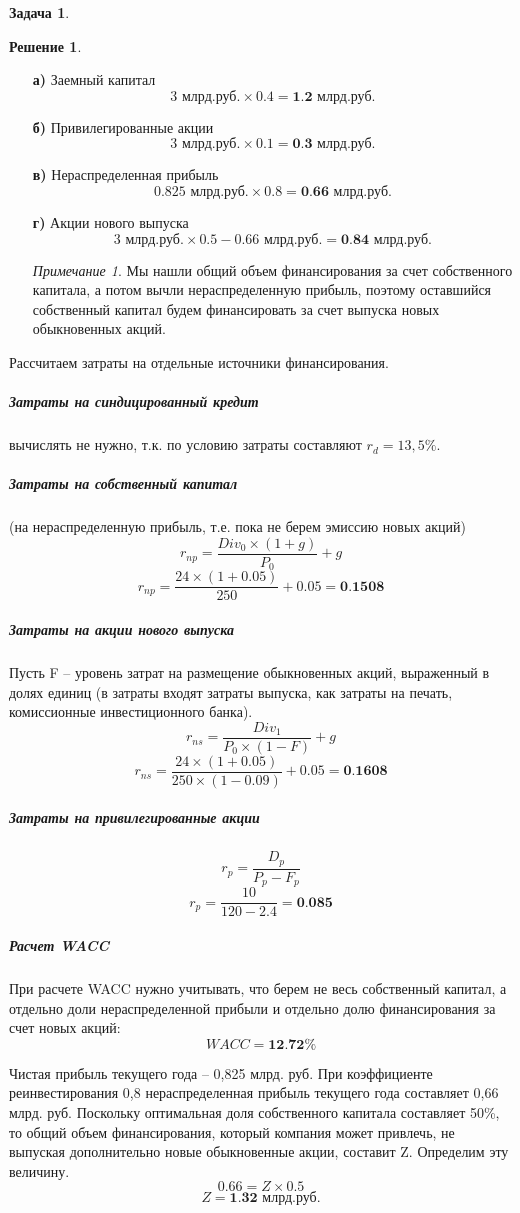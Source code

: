 \documentclass[a4paper, 14pt]{article}
\theoremstyle{plain} %
\theoremstyle{definition} %
\newtheorem*{solution}{Решение}
\newtheorem{problem}{Задача}[subsection]
\theoremstyle{remark} %
\newtheorem{nota}{Примечание}
\begin{document}
\begin{problem}
\begin{solution}
		\begin{itemize}
			\item[\textbf{а)}] Заемный капитал
			\[\text{3 млрд.руб.} \times 0.4 = \textbf{1.2 млрд.руб.}\]
			\item[\textbf{б)}] Привилегированные акции
			\[\text{3 млрд.руб.} \times 0.1 = \textbf{0.3 млрд.руб.}\]
			\item[\textbf{в)}] Нераспределенная прибыль
			\[\text{0.825 млрд.руб.} \times 0.8 = \textbf{0.66 млрд.руб.}\]
			\item[\textbf{г)}] Акции нового выпуска
			\[\text{3 млрд.руб.} \times 0.5 - \text{0.66 млрд.руб.}  = \textbf{0.84 млрд.руб.}\]
			\begin{nota}
				Мы нашли общий объем финансирования за счет собственного капитала, а потом вычли нераспределенную прибыль, поэтому оставшийся собственный капитал будем финансировать за счет выпуска новых обыкновенных акций.
			\end{nota}
		\end{itemize}

		Рассчитаем затраты на отдельные источники финансирования.
		\subparagraph{Затраты на синдицированный кредит} вычислять не нужно, т.к. по условию затраты составляют $r_{d} = 13,5\%$.
		\subparagraph{Затраты на собственный капитал} (на нераспределенную прибыль, т.е. пока не берем эмиссию новых акций)
		\[r_{np} = \frac{Div_{0}\times(1+g)}{P_{0}}+g\]
		\[r_{np} = \frac{24\times(1+0.05)}{250}+0.05 = \textbf{0.1508}\]
		\subparagraph{Затраты на акции нового выпуска} Пусть F  – уровень затрат на размещение обыкновенных акций, выраженный в долях единиц  (в затраты входят затраты выпуска, как затраты на печать, комиссионные инвестиционного банка).
		\[r_{ns} = \frac{Div_{1}}{P_{0}\times(1-F)}+g\]
		\[r_{ns} = \frac{24\times(1+0.05)}{250\times(1-0.09)}+0.05 = \textbf{0.1608}\]
		\subparagraph{Затраты на привилегированные акции}
		\[r_{p} = \frac{D_{p}}{P_{p} - F_{p}}\]
		\[r_{p} = \frac{10}{120 - 2.4} = \textbf{0.085}\]

		\subparagraph{Расчет WACC} При расчете  WACC нужно учитывать, что берем не весь собственный капитал, а отдельно доли нераспределенной прибыли и отдельно долю финансирования за счет новых акций:
		\[WACC = \textbf{12.72\%}\]

		Чистая прибыль текущего года    –    0,825 млрд. руб. При коэффициенте реинвестирования  0,8 нераспределенная прибыль текущего года составляет  0,66 млрд. руб. Поскольку оптимальная доля собственного капитала составляет  50\%, то общий объем финансирования, который компания может привлечь, не выпуская дополнительно новые обыкновенные акции, составит Z. Определим эту величину.
		\[0.66 = Z \times 0.5\]
		\[Z = \textbf{1.32 млрд.руб.}\]
	\end{solution}
\end{problem}
\end{document}
